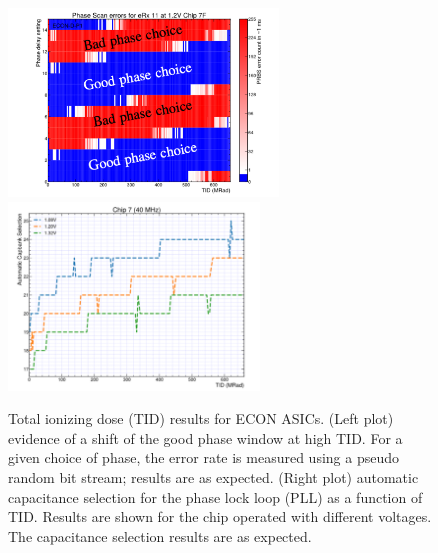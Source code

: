 \documentclass[twocolumn]{webofc}
\begin{document}
\begin{figure}[ht]
\centering
\includegraphics[height=5cm]{figures/econ-phaseTID.png}
\includegraphics[height=5cm]{figures/econ-capPLLTID.png}
\caption{Total ionizing dose (TID) results for ECON ASICs. (Left plot) evidence of a shift of the good phase window at high TID. For a given choice of phase, the error rate is measured using a pseudo random bit stream; results are as expected. (Right plot) automatic capacitance selection for the phase lock loop (PLL) as a function of TID. Results are shown for the chip operated with different voltages. The capacitance selection results are as expected.}
\label{fig:econ}
\end{figure}
\end{document}
